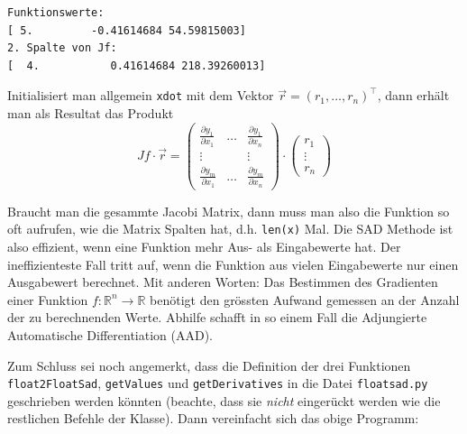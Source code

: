 \documentclass[
  a4paper,
  DIV=11]{scrreprt}
\theoremstyle{definition}
\theoremstyle{definition}
\theoremstyle{remark}
\begin{document}
\begin{verbatim}
Funktionswerte:
[ 5.         -0.41614684 54.59815003]
2. Spalte von Jf:
[  4.           0.41614684 218.39260013]
\end{verbatim}

Initialisiert man allgemein \texttt{xdot} mit dem Vektor
\(\vec{r} = (r_1, \ldots, r_n)^\intercal\), dann erhält man als Resultat
das Produkt \[
Jf \cdot \vec{r} = 
\begin{pmatrix}
    \frac{\partial y_1}{\partial x_1} & \ldots & \frac{\partial y_1}{\partial x_n} \\
    \vdots & & \vdots \\
    \frac{\partial y_m}{\partial x_1} & \ldots & \frac{\partial y_m}{\partial x_n}
\end{pmatrix}
\cdot \begin{pmatrix} r_1 \\ \vdots \\ r_n \end{pmatrix} 
\]

Braucht man die gesammte Jacobi Matrix, dann muss man also die Funktion
so oft aufrufen, wie die Matrix Spalten hat, d.h. \texttt{len(x)} Mal.
Die SAD Methode ist also effizient, wenn eine Funktion mehr Aus- als
Eingabewerte hat. Der ineffizienteste Fall tritt auf, wenn die Funktion
aus vielen Eingabewerte nur einen Ausgabewert berechnet. Mit anderen
Worten: Das Bestimmen des Gradienten einer Funktion
\(f: \mathbb{R}^n \rightarrow \mathbb{R}\) benötigt den grössten Aufwand
gemessen an der Anzahl der zu berechnenden Werte. Abhilfe schafft in so
einem Fall die Adjungierte Automatische Differentiation (AAD).

Zum Schluss sei noch angemerkt, dass die Definition der drei Funktionen
\texttt{float2FloatSad}, \texttt{getValues} und \texttt{getDerivatives}
in die Datei \texttt{floatsad.py} geschrieben werden könnten (beachte,
dass sie \emph{nicht} eingerückt werden wie die restlichen Befehle der
Klasse). Dann vereinfacht sich das obige Programm:
\end{document}
